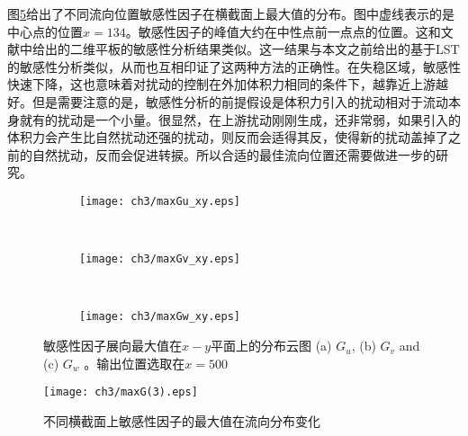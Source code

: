 图\ref{f:maxsen}给出了不同流向位置敏感性因子在横截面上最大值的分布。图中虚线表示的是中心点的位置$x=134$。敏感性因子的峰值大约在中性点前一点点的位置。这和文献\cite{pralits2000sensitivity}中给出的二维平板的敏感性分析结果类似。这一结果与本文之前给出的基于LST的敏感性分析类似，从而也互相印证了这两种方法的正确性。在失稳区域，敏感性快速下降，这也意味着对扰动的控制在外加体积力相同的条件下，越靠近上游越好。但是需要注意的是，敏感性分析的前提假设是体积力引入的扰动相对于流动本身就有的扰动是一个小量。很显然，在上游扰动刚刚生成，还非常弱，如果引入的体积力会产生比自然扰动还强的扰动，则反而会适得其反，使得新的扰动盖掉了之前的自然扰动，反而会促进转捩。所以合适的最佳流向位置还需要做进一步的研究。
\begin{figure}[H]
  \centering
  \begin{subfigure}{\textwidth}
  \texttt{[image: ch3/maxGu\_xy.eps]}
  \caption{\label{f:Gu_xy}}
  \end{subfigure}\\
  \bigskip
  \begin{subfigure}{\textwidth}
  \texttt{[image: ch3/maxGv\_xy.eps]}
  \caption{\label{f:Gv_xy}}
  \end{subfigure}\\
  \bigskip
  \begin{subfigure}{\textwidth}
  \texttt{[image: ch3/maxGw\_xy.eps]}
  \caption{\label{f:Gw_xy}}
  \end{subfigure}
  \caption{敏感性因子展向最大值在$x-y$平面上的分布云图 (a) $G_u$, (b) $G_v$ and (c) $G_w$ 。输出位置选取在$x=500$}\label{f:Guvw_xy}
\end{figure}
\begin{figure}[htb]
  \centering
  \texttt{[image: ch3/maxG(3).eps]}\\
  \caption{不同横截面上敏感性因子的最大值在流向分布变化}\label{f:maxsen}
\end{figure}

